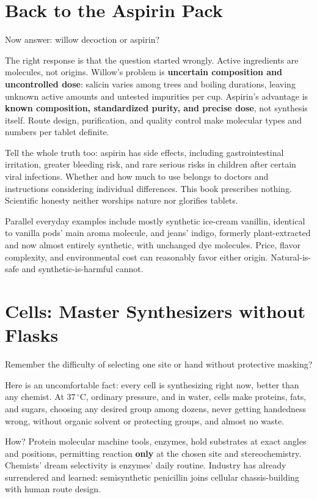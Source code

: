 \section{Back to the Aspirin Pack}

Now answer: willow decoction or aspirin?

The right response is that the question started wrongly. Active ingredients are molecules, not origins. Willow's problem is \textbf{uncertain composition and uncontrolled dose}: salicin varies among trees and boiling durations, leaving unknown active amounts and untested impurities per cup. Aspirin's advantage is \textbf{known composition, standardized purity, and precise dose}, not synthesis itself. Route design, purification, and quality control make molecular types and numbers per tablet definite.

Tell the whole truth too: aspirin has side effects, including gastrointestinal irritation, greater bleeding risk, and rare serious risks in children after certain viral infections. Whether and how much to use belongs to doctors and instructions considering individual differences. This book prescribes nothing. Scientific honesty neither worships nature nor glorifies tablets.

Parallel everyday examples include mostly synthetic ice-cream vanillin, identical to vanilla pods' main aroma molecule, and jeans' indigo, formerly plant-extracted and now almost entirely synthetic, with unchanged dye molecules. Price, flavor complexity, and environmental cost can reasonably favor either origin. Natural-is-safe and synthetic-is-harmful cannot.

\section{Cells: Master Synthesizers without Flasks}

Remember the difficulty of selecting one site or hand without protective masking?

Here is an uncomfortable fact: every cell is synthesizing right now, better than any chemist. At $37\,^{\circ}\mathrm{C}$, ordinary pressure, and in water, cells make proteins, fats, and sugars, choosing any desired group among dozens, never getting handedness wrong, without organic solvent or protecting groups, and almost no waste.

How? Protein molecular machine tools, enzymes, hold substrates at exact angles and positions, permitting reaction \textbf{only} at the chosen site and stereochemistry. Chemists' dream selectivity is enzymes' daily routine. Industry has already surrendered and learned: semisynthetic penicillin joins cellular chassis-building with human route design.

